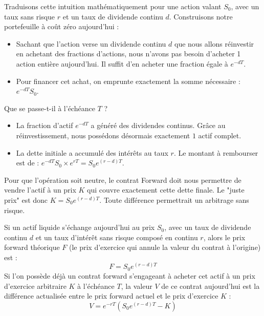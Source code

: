 \begin{proofbox}
Traduisons cette intuition mathématiquement pour une action valant $S_0$, avec un taux sans risque $r$ et un taux de dividende continu $d$.
Construisons notre portefeuille à coût zéro aujourd'hui :
\begin{itemize}[label=$\rightarrow$]
    \item Sachant que l'action verse un dividende continu $d$ que nous allons réinvestir en achetant des fractions d'actions, nous n'avons pas besoin d'acheter 1 action entière aujourd'hui. Il suffit d'en acheter une fraction égale à $e^{-dT}$.
    \item Pour financer cet achat, on emprunte exactement la somme nécessaire : $e^{-dT} S_0$.
\end{itemize}
Que se passe-t-il à l'échéance $T$ ?
\begin{itemize}[label=$\rightarrow$]
    \item La fraction d'actif $e^{-dT}$ a généré des dividendes continus. Grâce au réinvestissement, nous possédons désormais exactement $1$ actif complet.
    \item La dette initiale a accumulé des intérêts au taux $r$. Le montant à rembourser est de : $e^{-dT} S_0 \times e^{rT} = S_0 e^{(r-d)T}$.
\end{itemize}
Pour que l'opération soit neutre, le contrat Forward doit nous permettre de vendre l'actif à un prix $K$ qui couvre exactement cette dette finale. Le "juste prix" est donc $K = S_0 e^{(r-d)T}$. Toute différence permettrait un arbitrage sans risque.
\end{proofbox}

\newpage

\begin{theorembox}
Si un actif liquide s'échange aujourd'hui au prix $S_0$, avec un taux de dividende continu $d$ et un taux d'intérêt sans risque composé en continu $r$, alors le prix forward théorique $F$ (le prix d'exercice qui annule la valeur du contrat à l'origine) est :
\begin{equation*}
    F = S_0 e^{(r-d)T}
\end{equation*}
Si l'on possède déjà un contrat forward s'engageant à acheter cet actif à un prix d'exercice arbitraire $K$ à l'échéance $T$, la valeur $V$ de ce contrat aujourd'hui est la différence actualisée entre le prix forward actuel et le prix d'exercice $K$ :
\begin{equation*}
    V = e^{-rT} (S_0 e^{(r-d)T} - K)
\end{equation*}
\end{theorembox}

